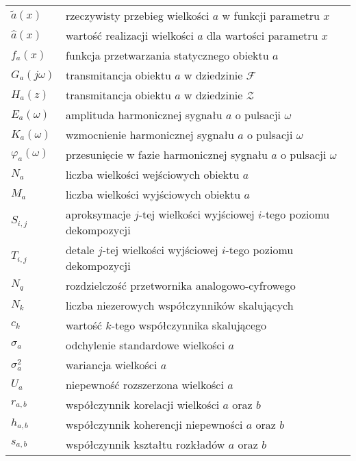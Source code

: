 \begin{longtable}[l]{ l @{~~--~~} p{376pt} }
$\tilde{a}(x)$                  & rzeczywisty przebieg wielkości $a$ w funkcji parametru $x$ \\
$\hat{a}(x)$                    & wartość realizacji wielkości $a$ dla wartości parametru $x$ \\
$f_{a}(x)$                      & funkcja przetwarzania statycznego obiektu $a$ \\
$G_{a}(j\omega)$                & transmitancja obiektu $a$ w dziedzinie $\mathcal{F}$ \\
$H_{a}(z)$                      & transmitancja obiektu $a$ w dziedzinie $\mathcal{Z}$ \\
$E_{a}(\omega)$                 & amplituda harmonicznej sygnału $a$ o pulsacji $\omega$ \\
$K_{a}(\omega)$                 & wzmocnienie harmonicznej sygnału $a$ o pulsacji $\omega$ \\
$\varphi_{a}(\omega)$           & przesunięcie w fazie harmonicznej sygnału $a$ o pulsacji $\omega$ \\
$N_{a}$                         & liczba wielkości wejściowych obiektu $a$ \\
$M_{a}$                         & liczba wielkości wyjściowych obiektu $a$ \\
$S_{i,j}$                       & aproksymacje $j$-tej wielkości wyjściowej $i$-tego poziomu dekompozycji \\
$T_{i,j}$                       & detale $j$-tej wielkości wyjściowej $i$-tego poziomu dekompozycji \\
$N_{q}$                         & rozdzielczość przetwornika analogowo-cyfrowego \\
$N_{k}$                         & liczba niezerowych współczynników skalujących \\
$c_{k}$                         & wartość $k$-tego współczynnika skalującego \\
$\sigma_{a}$                    & odchylenie standardowe wielkości $a$ \\
$\sigma_{a}^{2}$                & wariancja wielkości $a$ \\
$U_{a}$                         & niepewność rozszerzona wielkości $a$ \\
$r_{a,b}$                       & współczynnik korelacji wielkości $a$ oraz $b$ \\
$h_{a,b}$                       & współczynnik koherencji niepewności $a$ oraz $b$ \\
$s_{a,b}$                       & współczynnik kształtu rozkładów $a$ oraz $b$ \\

\end{longtable}
